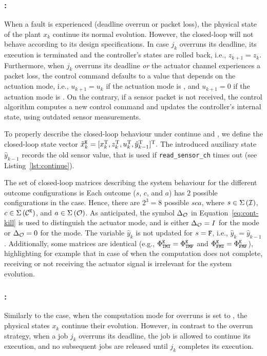 \subsubsection*{\tK{}:}
%
When a fault is experienced (deadline overrun or packet loss), the physical state of the plant $x_k$ continue its normal evolution.
However, the closed-loop will not behave according to its design specifications.
In case $j_k$ overruns its deadline, its execution is terminated and the controller's states are rolled back, i.e., $z_{k+1} = z_k$.
Furthermore, when $j_k$ overruns its deadline \emph{or} the actuator channel experiences a packet loss, the control command defaults to a value that depends on the actuation mode, i.e., $u_{k+1} = u_k$ if the actuation mode is \tH{}, and $u_{k+1} = 0$ if the actuation mode is \tZ{}.
On the contrary, if a sensor packet is not received, the control algorithm computes a new control command and updates the controller's internal state, using outdated sensor measurements.

To properly describe the closed-loop behaviour under continue and \tK{}, we define the closed-loop state vector 
%
$\tilde x_k^{\texttt{K}} = [ x_k^{\mathrm{\small{T}}}{}, z_k^{\mathrm{\small{T}}}{}, u_k^{\mathrm{\small{T}}}{}, \hat y_{k-1}^{\mathrm{\small{T}}}{} ]^{\mathrm{\small{T}}}{}.$
%
The introduced auxiliary state $\hat y_{k-1}$ records the old sensor value, that is used if \texttt{read\_sensor\_ch} times out (see Listing~\ref{lst:continue}).

The set of closed-loop matrices describing the system behaviour for the different outcome configurations is
{\small
%
}
Each outcome ($s$, $c$, and $a$) has $2$ possible configurations in the \tK{} case.
Hence, there are $2^3 = 8$ possible $sca$, where $s \in \Sigma\left( \mathcal{I} \right)$, $c \in \Sigma\,({\mathcal{C}^{\texttt{K}}})$, and $a \in \Sigma\left( \mathcal{O} \right)$.
As anticipated, the symbol $\Delta_{\mathcal{O}}$ in Equation~\eqref{eq:cont-kill} is used to distinguish the actuator mode, and is either $\Delta_{\mathcal{O}} = I$ for the \tH{} mode or $\Delta_{\mathcal{O}} = 0$ for the \tZ{} mode.
The variable $\hat y_k$ is not updated for $s = \texttt{F}$, i.e., $\hat y_k = \hat y_{k-1}$.
Additionally, some matrices are identical (e.g., $\Phi^{\texttt{K}}_{\texttt{T}\texttt{M}\texttt{T}}=\Phi^{\texttt{K}}_{\texttt{T}\texttt{M}\texttt{F}}$ and $\Phi^{\texttt{K}}_{\texttt{F}\texttt{M}\texttt{T}}=\Phi^{\texttt{K}}_{\texttt{F}\texttt{M}\texttt{F}}$), highlighting for example that in case of \tK{} when the computation does not complete, receiving or not receiving the actuator signal is irrelevant for the system evolution.

\subsubsection*{\tS{}:}
Similarly to the \tK{} case, when the computation mode for overruns is set to \tS{}, the physical states $x_k$ continue their evolution.
However, in contrast to the \tK{} overrun strategy, when a job $j_k$ overruns its deadline, the job is allowed to continue its execution, and no subsequent jobs are released until $j_k$ completes its execution.

